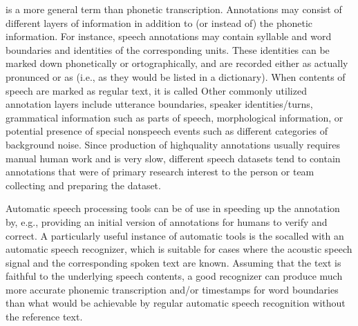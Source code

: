 \documentclass[letterpaper,10pt,english]{jupyterBook}
\begin{document}
\sphinxAtStartPar
{} is a more general term than phonetic
transcription. Annotations may consist of different layers of
information in addition to (or instead of) the phonetic information. For
instance, speech annotations may contain syllable and word boundaries
and identities of the corresponding units. These identities can be
marked down phonetically or ortographically, and are recorded either as
actually pronunced or as  (i.e., as they would be listed in a
dictionary). When contents of speech are marked as regular text, it is
called  Other commonly utilized annotation
layers include utterance boundaries, speaker identities/turns,
grammatical information such as parts of speech, morphological
information, or potential presence of special non\sphinxhyphen{}speech events such as
different categories of background noise. Since production of
high\sphinxhyphen{}quality annotations usually requires manual human work and is very
slow, different speech datasets tend to contain annotations that were of
primary research interest to the person or team collecting and preparing
the dataset.

\sphinxAtStartPar
Automatic speech processing tools can be of use in speeding up the
annotation by, e.g., providing an initial version of annotations for
humans to verify and correct. A particularly useful instance of
automatic tools is the so\sphinxhyphen{}called  with an automatic
speech recognizer, which is suitable for cases where the acoustic speech
signal and the corresponding spoken text are known. Assuming that the
text is faithful to the underlying speech contents, a good recognizer
can produce much more accurate phonemic transcription and/or timestamps
for word boundaries than what would be achievable by regular automatic
speech recognition without the reference text.
\end{document}
